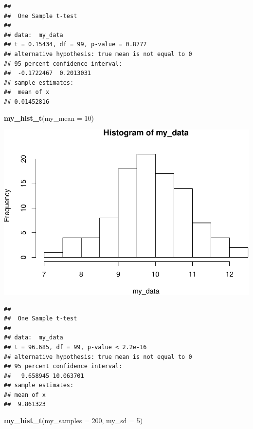 \documentclass[]{article}
\newenvironment{Shaded}{\begin{snugshade}}{\end{snugshade}}
\newcommand{\KeywordTok}[1]{\textcolor[rgb]{0.13,0.29,0.53}{\textbf{#1}}}
\newcommand{\DataTypeTok}[1]{\textcolor[rgb]{0.13,0.29,0.53}{#1}}
\newcommand{\DecValTok}[1]{\textcolor[rgb]{0.00,0.00,0.81}{#1}}
\newcommand{\NormalTok}[1]{#1}
\begin{document}
\begin{verbatim}
## 
##  One Sample t-test
## 
## data:  my_data
## t = 0.15434, df = 99, p-value = 0.8777
## alternative hypothesis: true mean is not equal to 0
## 95 percent confidence interval:
##  -0.1722467  0.2013031
## sample estimates:
##  mean of x 
## 0.01452816
\end{verbatim}

\begin{Shaded}
\begin{Highlighting}[]
\KeywordTok{my_hist_t}\NormalTok{(}\DataTypeTok{my_mean =} \DecValTok{10}\NormalTok{)}
\end{Highlighting}
\end{Shaded}

\includegraphics{slow-r_files/figure-latex/unnamed-chunk-54-2.pdf}

\begin{verbatim}
## 
##  One Sample t-test
## 
## data:  my_data
## t = 96.685, df = 99, p-value < 2.2e-16
## alternative hypothesis: true mean is not equal to 0
## 95 percent confidence interval:
##   9.658945 10.063701
## sample estimates:
## mean of x 
##  9.861323
\end{verbatim}

\begin{Shaded}
\begin{Highlighting}[]
\KeywordTok{my_hist_t}\NormalTok{(}\DataTypeTok{my_samples =} \DecValTok{200}\NormalTok{, }\DataTypeTok{my_sd =} \DecValTok{5}\NormalTok{)}
\end{Highlighting}
\end{Shaded}
\end{document}
